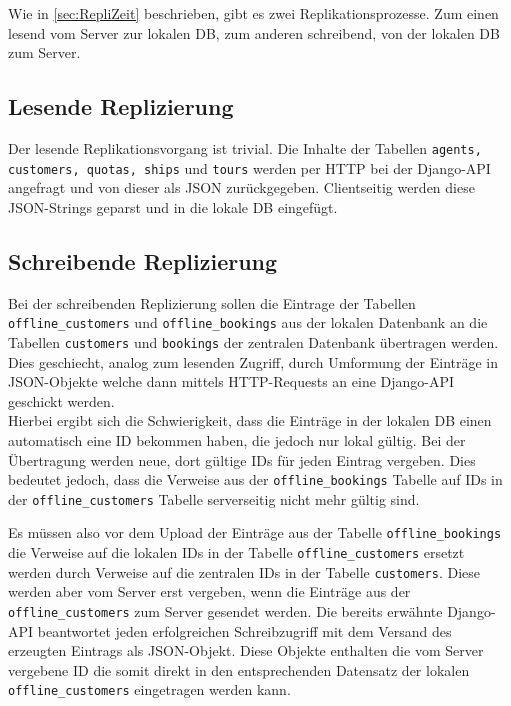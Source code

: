 \documentclass[12pt,a4paper,ngerman,english]{report}
\begin{document}
Wie in \autoref{sec:RepliZeit} beschrieben, gibt es zwei Replikationsprozesse. Zum einen lesend vom Server zur lokalen DB, zum anderen schreibend, von der lokalen DB zum Server.

\subsection{Lesende Replizierung}

Der lesende Replikationsvorgang ist trivial. Die Inhalte der Tabellen \texttt{agents, customers, quotas, ships} und \texttt{tours} werden per HTTP bei der Django-API angefragt und von dieser als JSON zurückgegeben. Clientseitig werden diese JSON-Strings geparst und in die lokale DB eingefügt. 

\subsection{Schreibende Replizierung}
\label{subsec:SchrRepl}

Bei der schreibenden Replizierung sollen die Eintrage der Tabellen \texttt{offline\_customers} und \texttt{offline\_bookings} aus der lokalen Datenbank an die Tabellen \texttt{customers} und \texttt{bookings} der zentralen Datenbank übertragen werden. Dies geschiecht, analog zum lesenden Zugriff, durch Umformung der Einträge in JSON-Objekte welche dann mittels HTTP-Requests an eine Django-API geschickt werden.\\

Hierbei ergibt sich die Schwierigkeit, dass die Einträge in der lokalen DB einen automatisch eine ID bekommen haben, die jedoch nur lokal gültig. Bei der Übertragung werden neue, dort gültige IDs für jeden Eintrag vergeben. Dies bedeutet jedoch, dass die Verweise aus der \texttt{offline\_bookings} Tabelle auf IDs in der \texttt{offline\_customers} Tabelle serverseitig nicht mehr gültig sind.\\ 

Es müssen also vor dem Upload der Einträge aus der Tabelle \texttt{offline\_bookings} die Verweise auf die lokalen IDs in der Tabelle \texttt{offline\_customers} ersetzt werden durch Verweise auf die zentralen IDs in der Tabelle \texttt{customers}. Diese werden aber vom Server erst vergeben, wenn die Einträge aus der \texttt{offline\_customers} zum Server gesendet werden. Die bereits erwähnte Django-API beantwortet jeden erfolgreichen Schreibzugriff mit dem Versand des erzeugten Eintrags als JSON-Objekt. Diese Objekte enthalten die vom Server vergebene ID die somit direkt in den entsprechenden Datensatz der lokalen \texttt{offline\_customers} eingetragen werden kann.\\
\end{document}
